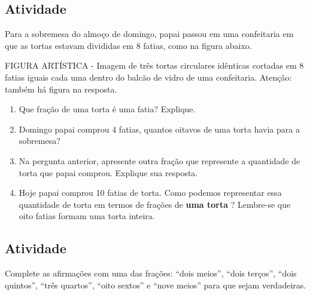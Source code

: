 \subsection{Atividade}

Para a sobremesa do almoço de domingo, papai passou em uma confeitaria em que as tortas estavam divididas em 8 fatias, como na figura abaixo. 

\begin{imagem*}[breakable]{}{}   FIGURA ARTÍSTICA - Imagem de três tortas circulares idênticas cortadas em 8 fatias iguais cada uma dentro do balcão de vidro de uma confeitaria. Atenção: também há figura na resposta.  
\end{imagem*}

\begin{enumerate} [\quad a)] %
  \item     Que fração de uma torta é uma fatia? Explique.
  \item     Domingo papai comprou 4 fatias, quantos oitavos de uma torta havia para a sobremesa?
  \item     Na pergunta anterior, apresente outra fração que represente a quantidade de torta que papai comprou. Explique sua resposta.
  \item     Hoje papai comprou 10 fatias de torta. Como podemos representar essa quantidade de torta em termos de frações de     {\bf uma torta}    ? Lembre-se que oito fatias formam uma torta inteira.
\end{enumerate} %

\subsection{Atividade}

Complete as afirmações com uma das frações: ``dois meios'', ``dois terços'', ``dois quintos'', ``três quartos'', ``oito sextos'' e ``nove meios'' para que sejam verdadeiras.

